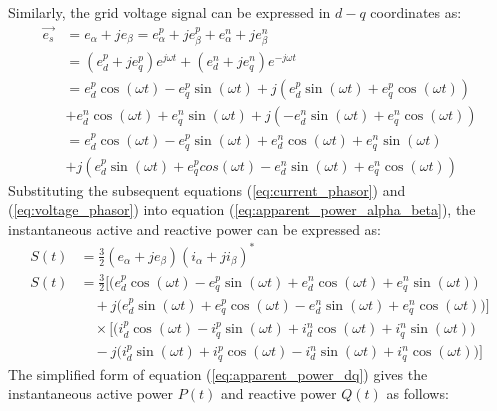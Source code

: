 Similarly, the grid voltage signal can be expressed in $d-q$ coordinates as:
\begin{equation}
    \begin{split}
        \vec{e_{s}} &= e_{\alpha} + je_{\beta} = e_{\alpha}^{p} + je_{\beta}^{p} + e_{\alpha}^{n} + je_{\beta}^{n} \\
        &= (e_{d}^{p} + je_{q}^{p})e^{j\omega t} + (e_{d}^{n} + je_{q}^{n})e^{-j\omega t}\\
        &= e_{d}^{p} \cos(\omega t) - e_{q}^{p} \sin(\omega t) + j(e_{d}^{p} \sin(\omega t) + e_{q}^{p} \cos(\omega t))\\
        &+ e_{d}^{n} \cos(\omega t) + e_{q}^{n} \sin(\omega t) + j(-e_{d}^{n} \sin(\omega t) + e_{q}^{n} \cos(\omega t))\\
        &= e_{d}^{p} \cos(\omega t) - e_{q}^{p} \sin(\omega t) + e_{d}^{n} \cos(\omega t) + e_{q}^{n} \sin(\omega t)\\
        &+ j(e_{d}^{p} \sin(\omega t) + e_{q}^{p} cos(\omega t) - e_{d}^{n} \sin(\omega t) + e_{q}^{n} \cos(\omega t))
    \end{split}
    \label{eq:voltage_phasor}
\end{equation}
Substituting the subsequent equations (\ref{eq:current_phasor}) and (\ref{eq:voltage_phasor}) into equation (\ref{eq:apparent_power_alpha_beta}),
the instantaneous active and reactive power can be expressed as:
\begin{equation}
    \begin{split}
        S(t) &= \frac{3}{2}(e_{\alpha} + je_{\beta})(i_{\alpha} + ji_{\beta})^{*} \\
        S(t) &= \frac{3}{2}\Big[ \big(e_{d}^{p}\cos(\omega t) - e_{q}^{p}\sin(\omega t) + e_{d}^{n}\cos(\omega t) + e_{q}^{n}\sin(\omega t)\big) \\
            &\quad + j\big(e_{d}^{p}\sin(\omega t) + e_{q}^{p}\cos(\omega t) - e_{d}^{n}\sin(\omega t) + e_{q}^{n}\cos(\omega t)\big) \Big] \\
        &\quad \times \Big[ \big(i_{d}^{p}\cos(\omega t) - i_{q}^{p}\sin(\omega t) + i_{d}^{n}\cos(\omega t) + i_{q}^{n}\sin(\omega t)\big) \\
            &\quad - j\big(i_{d}^{p}\sin(\omega t) + i_{q}^{p}\cos(\omega t) - i_{d}^{n}\sin(\omega t) + i_{q}^{n}\cos(\omega t)\big)\Big]
    \end{split}
    \label{eq:apparent_power_dq}
\end{equation}
The simplified form of equation (\ref{eq:apparent_power_dq}) gives the instantaneous active power $P(t)$ and reactive power $Q(t)$ as follows:
